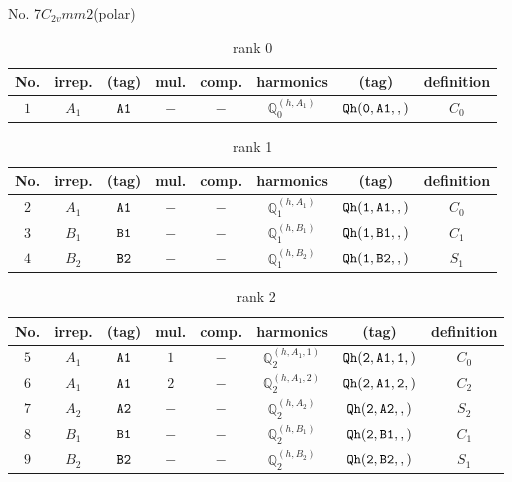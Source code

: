 \documentclass[fleqn,8pt]{jsarticle}
\begin{document}
\setcounter{MaxMatrixCols}{16}

\begin{center}
\LARGE
No. 7\quad$C_{2v}$\quad$mm2$\quad[ orthorhombic ] (polar)
\end{center}
\begin{table}[ht!]
\begin{center}
\caption{rank 0}
\renewcommand{\arraystretch}{1.3}
\begin{tabular}{cccccccc} \hline \hline
No. & irrep. & (tag) & mul. & comp. & harmonics & (tag) & definition \\ \hline
$ 1 $ & $ A_{1} $ & $ {\tt A1} $ & $ - $ & $ - $ & $ \mathbb{Q}_{0}^{(h,A_{1})} $ & $ {\tt Qh(0,A1,,)} $ & $ C_{0} $ \\
 \hline \hline
\end{tabular}
\end{center}
\end{table}
\begin{table}[ht!]
\begin{center}
\caption{rank 1}
\renewcommand{\arraystretch}{1.3}
\begin{tabular}{cccccccc} \hline \hline
No. & irrep. & (tag) & mul. & comp. & harmonics & (tag) & definition \\ \hline
$ 2 $ & $ A_{1} $ & $ {\tt A1} $ & $ - $ & $ - $ & $ \mathbb{Q}_{1}^{(h,A_{1})} $ & $ {\tt Qh(1,A1,,)} $ & $ C_{0} $ \\
$ 3 $ & $ B_{1} $ & $ {\tt B1} $ & $ - $ & $ - $ & $ \mathbb{Q}_{1}^{(h,B_{1})} $ & $ {\tt Qh(1,B1,,)} $ & $ C_{1} $ \\
$ 4 $ & $ B_{2} $ & $ {\tt B2} $ & $ - $ & $ - $ & $ \mathbb{Q}_{1}^{(h,B_{2})} $ & $ {\tt Qh(1,B2,,)} $ & $ S_{1} $ \\
 \hline \hline
\end{tabular}
\end{center}
\end{table}
\begin{table}[ht!]
\begin{center}
\caption{rank 2}
\renewcommand{\arraystretch}{1.3}
\begin{tabular}{cccccccc} \hline \hline
No. & irrep. & (tag) & mul. & comp. & harmonics & (tag) & definition \\ \hline
$ 5 $ & $ A_{1} $ & $ {\tt A1} $ & $ 1 $ & $ - $ & $ \mathbb{Q}_{2}^{(h,A_{1},1)} $ & $ {\tt Qh(2,A1,1,)} $ & $ C_{0} $ \\
$ 6 $ & $ A_{1} $ & $ {\tt A1} $ & $ 2 $ & $ - $ & $ \mathbb{Q}_{2}^{(h,A_{1},2)} $ & $ {\tt Qh(2,A1,2,)} $ & $ C_{2} $ \\
$ 7 $ & $ A_{2} $ & $ {\tt A2} $ & $ - $ & $ - $ & $ \mathbb{Q}_{2}^{(h,A_{2})} $ & $ {\tt Qh(2,A2,,)} $ & $ S_{2} $ \\
$ 8 $ & $ B_{1} $ & $ {\tt B1} $ & $ - $ & $ - $ & $ \mathbb{Q}_{2}^{(h,B_{1})} $ & $ {\tt Qh(2,B1,,)} $ & $ C_{1} $ \\
$ 9 $ & $ B_{2} $ & $ {\tt B2} $ & $ - $ & $ - $ & $ \mathbb{Q}_{2}^{(h,B_{2})} $ & $ {\tt Qh(2,B2,,)} $ & $ S_{1} $ \\
 \hline \hline
\end{tabular}
\end{center}
\end{table}
\end{document}
